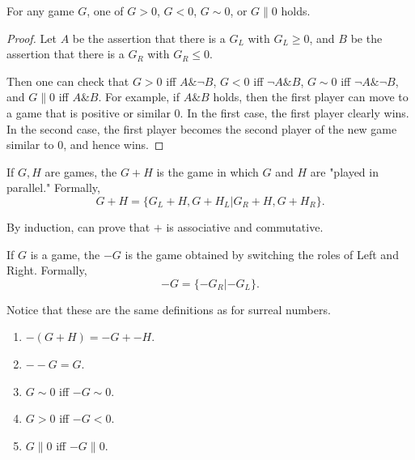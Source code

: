 \begin{lemma} %
For any game $G$, one of $G>0$, $G<0$, $G\sim 0$, or $G\parallel 0$ holds.
 \end{lemma}

\begin{proof} %
Let $A$ be the assertion that there is a $G_L$ with $G_L\ge 0$, and $B$ be the assertion that there is a $G_R$ with $G_R\le 0$.

Then one can check that $G>0$ iff $A\& \neg B$, $G<0$ iff $\neg A \& B$, $G\sim 0$ iff $\neg A \& \neg B$, and $G\parallel 0$ iff $A\& B$. For example, if $A \& B$ holds, then the first player can move to a game that is positive or similar $0$. In the first case, the first player clearly wins. In the second case, the first player becomes the second player of the new game similar to $0$, and hence wins.
 \end{proof}

\begin{definition} %
 \end{definition}
If $G,H$ are games, the  $G+H$ is the game in which $G$ and $H$ are "played in parallel." Formally,
$$G+H=\{G_L+H,G+H_L|G_R+H, G+H_R\}.$$

\begin{remark} %
By induction, can prove that $+$ is associative and commutative. 
\end{remark}

\begin{definition} %
If $G$ is a game, the  $-G$ is the game obtained by switching the roles of Left and Right. Formally,
$$-G=\{-G_R|-G_L\}.$$
 \end{definition}

Notice that these are the same definitions as for surreal numbers.

\begin{lemma} %
\begin{enumerate}
  \item  $-(G+H)=-G+-H$.
  \item  $--G=G$.
  \item  $G\sim 0$ iff $-G\sim 0$.
  \item  $G>0$ iff $-G<0$.
  \item  $G\parallel 0$ iff $-G\parallel 0$.
\end{enumerate}
 \end{lemma}

